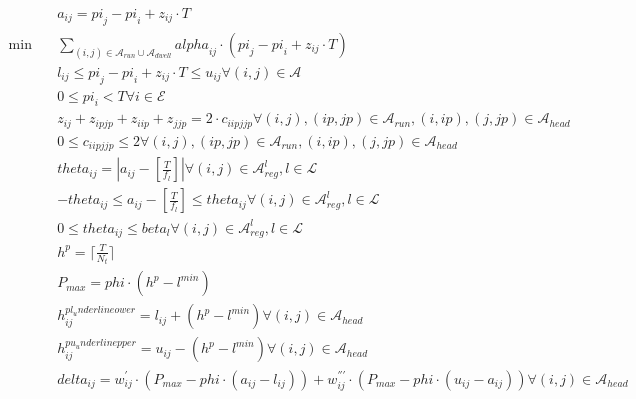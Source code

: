 \begin{align}
  & a_{i j} = \mathit{pi}_{j} - \mathit{pi}_{i} + z_{i j} \cdot T \tag{eq\_0001} \\
  \min\quad & \underset{\left(i , j\right) \in \mathbf{\mathcal{A}}_{run} \cup \mathbf{\mathcal{A}}_{dwell}}{\sum} \mathit{alpha}_{i j} \cdot \left(\mathit{pi}_{j} - \mathit{pi}_{i} + z_{i j} \cdot T\right) \tag{eq\_0002} \\
  & l_{i j} \leq \mathit{pi}_{j} - \mathit{pi}_{i} + z_{i j} \cdot T \leq u_{i j} \forall \left(i , j\right) \in \mathbf{\mathcal{A}} \tag{eq\_0003} \\
  & 0 \leq \mathit{pi}_{i} < T \forall i \in \mathbf{\mathcal{E}} \tag{eq\_0004} \\
  & z_{i j} + z_{ip jp} + z_{i ip} + z_{j jp} = 2 \cdot c_{i ip j jp} \forall \left(i , j\right) , \left(ip , jp\right) \in \mathbf{\mathcal{A}}_{run} , \left(i , ip\right) , \left(j , jp\right) \in \mathbf{\mathcal{A}}_{head} \tag{eq\_0006} \\
  & 0 \leq c_{i ip j jp} \leq 2 \forall \left(i , j\right) , \left(ip , jp\right) \in \mathbf{\mathcal{A}}_{run} , \left(i , ip\right) , \left(j , jp\right) \in \mathbf{\mathcal{A}}_{head} \tag{eq\_0007} \\
  & \mathit{theta}_{i j} = \left|a_{i j} - \left[\frac{T}{f_{l}}\right]\right| \forall \left(i , j\right) \in \mathbf{\mathcal{A}}_{reg}^{l} , l \in \mathbf{\mathcal{L}} \tag{eq\_0009} \\
  & - \mathit{theta}_{i j} \leq a_{i j} - \left[\frac{T}{f_{l}}\right] \leq \mathit{theta}_{i j} \forall \left(i , j\right) \in \mathbf{\mathcal{A}}_{reg}^{l} , l \in \mathbf{\mathcal{L}} \tag{eq\_0011} \\
  & 0 \leq \mathit{theta}_{i j} \leq \mathit{beta}_{l} \forall \left(i , j\right) \in \mathbf{\mathcal{A}}_{reg}^{l} , l \in \mathbf{\mathcal{L}} \tag{eq\_0012} \\
  & h^{p} = \lceil \frac{T}{N_{t}} \rceil \tag{eq\_0013} \\
  & P_{m a x} = \mathit{phi} \cdot \left(h^{p} - l^{m i n}\right) \tag{eq\_0014} \\
  & h_{i j}^{p l_underline o w e r} = l_{i j} + \left(h^{p} - l^{m i n}\right) \forall \left(i , j\right) \in \mathbf{\mathcal{A}}_{head} \tag{eq\_0016} \\
  & h_{i j}^{p u_underline p p e r} = u_{i j} - \left(h^{p} - l^{m i n}\right) \forall \left(i , j\right) \in \mathbf{\mathcal{A}}_{head} \tag{eq\_0017} \\
  & \mathit{delta}_{i j} = w_{i j}^{'} \cdot \left(P_{m a x} - \mathit{phi} \cdot \left(a_{i j} - l_{i j}\right)\right) + w_{i j}^{'' '} \cdot \left(P_{m a x} - \mathit{phi} \cdot \left(u_{i j} - a_{i j}\right)\right) \forall \left(i , j\right) \in \mathbf{\mathcal{A}}_{head} \tag{eq\_0019} \\

\end{align}
